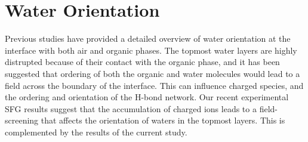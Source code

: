 \section{Water Orientation}

Previous studies have provided a detailed overview of water orientation at the interface with both air and organic phases.\cite{McFearin2009,Hore2008,Fan2009,Wick2006c,Wick2008a} The topmost water layers are highly distrupted because of their contact with the organic phase, and it has been suggested that ordering of both the organic and water molecules would lead to a field across the boundary of the interface.\cite{McFearin2009,Hore2008} This can influence charged species, and the ordering and orientation of the H-bond network. Our recent experimental SFG results suggest that the accumulation of charged ions leads to a field-screening that affects the orientation of waters in the topmost layers. This is complemented by the results of the current study.

